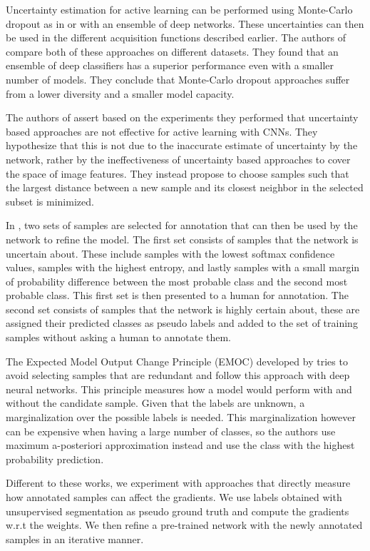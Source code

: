 \documentclass[letterpaper, 10 pt, conference]{ieeeconf}  %
\begin{document}
Uncertainty estimation for active learning can be performed using Monte-Carlo dropout as in \cite{gal2017deep} or with an ensemble of deep networks. These uncertainties can then be used in the different acquisition functions described earlier. The authors of \cite{beluch2018power} compare both of these approaches on different datasets. They found that an ensemble of deep classifiers has a superior performance even with a smaller number of models. They conclude that Monte-Carlo dropout approaches suffer from a lower diversity and a smaller model capacity.

The authors of \cite{sener2017geometric} assert based on the experiments they performed that uncertainty based approaches are not effective for active learning with CNNs. They hypothesize that this is not due to the inaccurate estimate of uncertainty by the network, rather by the ineffectiveness of uncertainty based approaches to cover the space of image features. They instead propose to choose samples such that the largest distance between a new sample and its closest neighbor in the selected subset is minimized.

In \cite{wang2017cost}, two sets of samples are selected for annotation that can then be used by the network to refine the model. The first set consists of samples that the network is uncertain about. These include samples with the lowest softmax confidence values, samples with the highest entropy, and lastly samples with a small margin of probability difference between the most probable class and the second most probable class. This first set is then presented to a human for annotation. The second set consists of samples that the network is highly certain about, these are assigned their predicted classes as pseudo labels and added to the set of training samples without asking a human to annotate them.

The Expected Model Output Change Principle (EMOC) developed by \cite{freytag2014selecting} tries to avoid selecting samples that are redundant and \cite{kading2016active} follow this approach with deep neural networks. This principle measures how a model would perform with and without the candidate sample. Given that the labels are unknown, a marginalization over the possible labels is needed. This marginalization however can be expensive when having a large number of classes, so the authors use maximum a-posteriori approximation instead and use the class with the highest probability prediction.

Different to these works, we experiment with approaches that directly measure how annotated samples can affect the gradients. We use labels obtained with unsupervised segmentation as pseudo ground truth and compute the gradients w.r.t the weights. We then refine a pre-trained network with the newly annotated samples in an iterative manner. 
\end{document}
